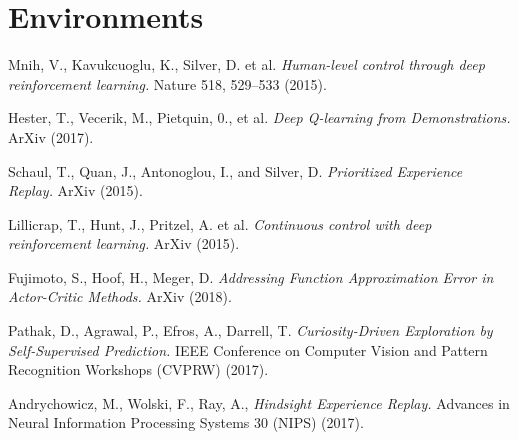 \documentclass[12pt,a4paper]{article}
\begin{document}
\section{Environments}


\begin{thebibliography}{99}


  Mnih, V., Kavukcuoglu, K., Silver, D. et al. 
  {\em Human-level control through deep reinforcement learning.} 
   Nature 518, 529–533 (2015).

  Hester, T., Vecerik, M., Pietquin, 0., et al. 
  {\em Deep Q-learning from Demonstrations.}
  ArXiv (2017).

  Schaul, T., Quan, J., Antonoglou, I., and Silver, D.
  {\em Prioritized Experience Replay.}
  ArXiv (2015).

  Lillicrap, T., Hunt, J., Pritzel, A. et al.
  {\em Continuous control with deep reinforcement learning.}
  ArXiv (2015).

  Fujimoto, S., Hoof, H., Meger, D.
  {\em Addressing Function Approximation Error in Actor-Critic Methods.}
  ArXiv (2018).

   Pathak, D., Agrawal, P., Efros, A., Darrell, T.
  {\em Curiosity-Driven Exploration by Self-Supervised Prediction.}
  IEEE Conference on Computer Vision and Pattern Recognition Workshops (CVPRW) (2017).

   Andrychowicz, M., Wolski, F., Ray, A.,
  {\em Hindsight Experience Replay.}
  Advances in Neural Information Processing Systems 30 (NIPS) (2017).

\end{thebibliography}


	
\end{document}
